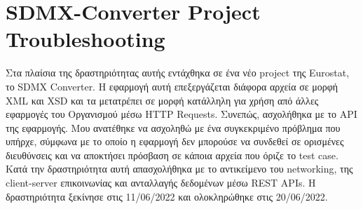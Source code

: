 \section*{SDMX-Converter Project Troubleshooting}
Στα πλαίσια της δραστηριότητας αυτής εντάχθηκα σε ένα νέο project της Eurostat, το SDMX Converter. Η εφαρμογή αυτή επεξεργάζεται διάφορα αρχεία σε μορφή XML και XSD και τα μετατρέπει σε μορφή κατάλληλη για χρήση από 
άλλες εφαρμογές του Οργανισμού μέσω HTTP Requests. Συνεπώς, ασχολήθηκα με το API της εφαρμογής. Μου ανατέθηκε να ασχοληθώ με ένα συγκεκριμένο πρόβλημα που υπήρχε, σύμφωνα με το οποίο η εφαρμογή δεν μπορούσε να 
συνδεθεί σε ορισμένες διευθύνσεις και να αποκτήσει πρόσβαση σε κάποια αρχεία που όριζε το test case. Κατά την δραστηριότητα αυτή απασχολήθηκα με το αντικείμενο του networking, της client-server επικοινωνίας και 
ανταλλαγής δεδομένων μέσω REST APIs. Η δραστηριότητα ξεκίνησε στις 11/06/2022 και ολοκληρώθηκε στις 20/06/2022.